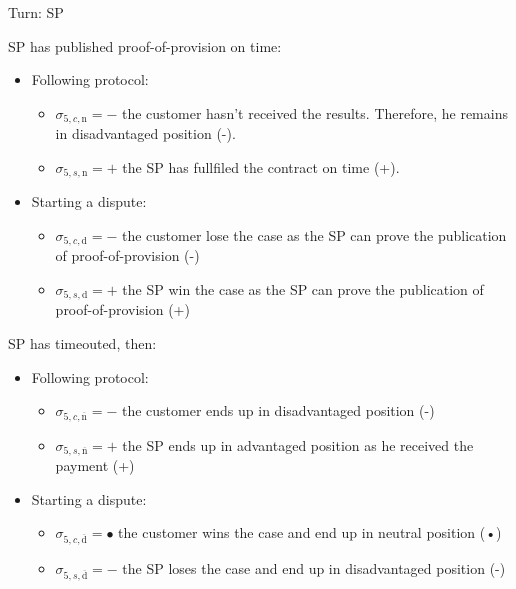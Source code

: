 \documentclass{ieeeaccess}
\begin{document}
Turn: SP

SP has published proof-of-provision on time:

\begin{itemize}
\item
  Following protocol:

  \begin{itemize}
  
  \item
    \(\sigma_{5, c, \mathrm{n}} = -\) the customer hasn't received the
    results. Therefore, he remains in disadvantaged position (-).
  \item
    \(\sigma_{5, s, \mathrm{n}} = +\) the SP has fullfiled the contract
    on time (+).
  \end{itemize}
\item
  Starting a dispute:

  \begin{itemize}
  
  \item
    \(\sigma_{5, c, \mathrm{d}} = -\) the customer lose the case as the
    SP can prove the publication of proof-of-provision (-)
  \item
    \(\sigma_{5, s, \mathrm{d}} = +\) the SP win the case as the SP can
    prove the publication of proof-of-provision (+)
  \end{itemize}
\end{itemize}

SP has timeouted, then:

\begin{itemize}
\item
  Following protocol:

  \begin{itemize}
  
  \item
    \(\sigma_{5, c, \overline{\mathrm{n}}} = -\) the customer ends up in
    disadvantaged position (-)
  \item
    \(\sigma_{5, s, \overline{\mathrm{n}}} = +\) the SP ends up in
    advantaged position as he received the payment (+)
  \end{itemize}
\item
  Starting a dispute:

  \begin{itemize}
  
  \item
    \(\sigma_{5, c, \overline{\mathrm{d}}} = •\) the customer wins the
    case and end up in neutral position (•)
  \item
    \(\sigma_{5, s, \overline{\mathrm{d}}} = -\) the SP loses the case
    and end up in disadvantaged position (-)
  \end{itemize}
\end{itemize}
\end{document}
